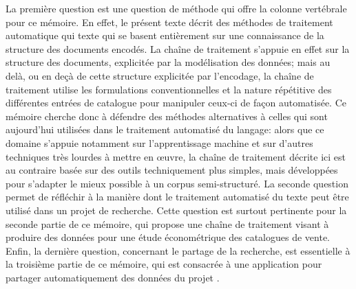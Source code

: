 La première question est une question de méthode qui offre la colonne vertébrale pour ce mémoire. En effet, le présent texte décrit des méthodes de traitement automatique qui texte qui se basent entièrement sur une connaissance de la structure des documents encodés. La chaîne de traitement s'appuie en effet sur la structure des documents, explicitée par la modélisation des données; mais au delà, ou en deçà de cette structure explicitée par l'encodage, la chaîne de traitement utilise les formulations conventionnelles et la nature répétitive des différentes entrées de catalogue pour manipuler ceux-ci de façon automatisée. Ce mémoire cherche donc à défendre des méthodes alternatives à celles qui sont aujourd'hui utilisées dans le traitement automatisé du langage: alors que ce domaine s'appuie notamment sur l'apprentissage machine et sur d'autres techniques très lourdes à mettre en œuvre, la chaîne de traitement décrite ici est au contraire basée sur des outils techniquement plus simples, mais développées pour s'adapter le mieux possible à un corpus semi-structuré. La seconde question permet de réfléchir à la manière dont le traitement automatisé du texte peut être utilisé dans un projet de recherche. Cette question est surtout pertinente pour la seconde partie de ce mémoire, qui propose une chaîne de traitement visant à produire des données pour une étude économétrique des catalogues de vente. Enfin, la dernière question, concernant le partage de la recherche, est essentielle à la troisième partie de ce mémoire, qui est consacrée à une application pour partager automatiquement des données du projet \mssktb{}.

